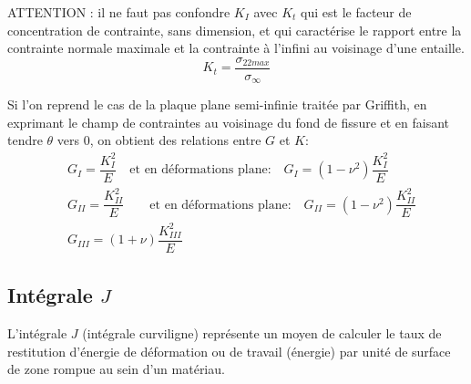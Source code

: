 \medskip
{}
ATTENTION : il ne faut pas confondre $K_I$ avec $K_t$ qui est le facteur de concentration
de contrainte, sans dimension, et qui caractérise le rapport entre la contrainte normale
maximale et la contrainte à l'infini au voisinage d'une entaille.
\begin{equation} K_t = \dfrac{\sigma_{22 max}}{\sigma_\infty} \end{equation}

\medskip
Si l'on reprend le cas de la plaque plane semi-infinie traitée par Griffith,
en exprimant le champ de contraintes au voisinage du fond de fissure et en faisant tendre $\theta$ vers $0$,
on obtient des relations entre $G$ et $K$:
\begin{align}
&G_I = \dfrac{K_I^2}E \quad \text{et en déformations plane:}\quad
G_I = (1-\nu^2)\dfrac{K_I^2}E \\
&G_{II} = \dfrac{K_{II}^2}E \qquad \text{et en déformations plane:}\quad
G_{II} = (1-\nu^2)\dfrac{K_{II}^2}E \\
&G_{III} = (1+\nu)\dfrac{K_{III}^2}E
\end{align}

\medskip
\subsection{Intégrale $J$}

\medskip
L'intégrale $J$ (intégrale curviligne) représente un moyen de calculer le taux de restitution d'énergie
de déformation ou de travail (énergie) par unité de surface de zone rompue au sein d'un matériau.

